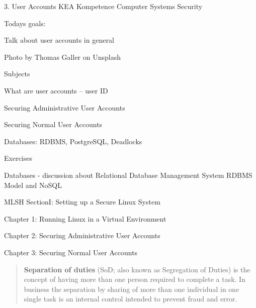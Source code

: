 \documentclass[Screen16to9,17pt]{foils}
\begin{document}
\mytitlepage
{3. User Accounts}
{KEA Kompetence Computer Systems Security \the\year}




Todays goals:
\begin{list2}
\item Talk about user accounts in general
\end{list2}

  Photo by Thomas Galler on Unsplash


\begin{list1}
\item Subjects
\begin{list2}
\item What are user accounts -- user ID
\item Securing Administrative User Accounts
\item Securing Normal User Accounts
\item Databases: RDBMS, PostgreSQL, Deadlocks
\end{list2}
\item Exercises
\begin{list2}
\item Databases - discussion about Relational Database Management System RDBMS Model and NoSQL
\end{list2}
\end{list1}




MLSH SectionI: Setting up a Secure Linux System
\begin{list1}
\item Chapter 1: Running Linux in a Virtual Environment
\item Chapter 2: Securing Administrative User Accounts
\item Chapter 3: Securing Normal User Accounts
\end{list1}




\begin{quote}
{\bf Separation of duties} (SoD; also known as Segregation of Duties) is the concept of having more than one person required to complete a task. In business the separation by sharing of more than one individual in one single task is an internal control intended to prevent fraud and error.
\end{quote}
\end{document}
